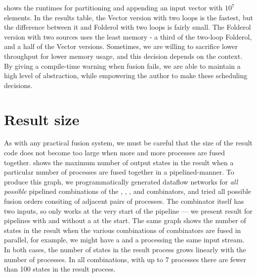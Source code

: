  shows the runtimes for partitioning and appending an input vector with $10^7$ elements.
In the results table, the Vector version with two loops is the fastest, but the difference between it and Folderol with two loops is fairly small.
The Folderol version with two sources uses the least memory - a third of the two-loop Folderol, and a half of the Vector versions.
Sometimes, we are willing to sacrifice lower throughput for lower memory usage, and this decision depends on the context.
By giving a compile-time warning when fusion fails, we are able to maintain a high level of abstraction, while empowering the author to make these scheduling decisions.

\section{Result size}

As with any practical fusion system, we must be careful that the size of the result code does not become too large when more and more processes are fused together.
 shows the maximum number of output states in the result when a particular number of processes are fused together in a pipelined-manner.
To produce this graph, we programmatically generated dataflow networks for \emph{all possible} pipelined combinations of the \Hs@map@, \Hs@filter@, \Hs@scan@, \Hs@group@ and \Hs@join@ combinators, and tried all possible fusion orders consiting of adjacent pairs of processes.
The \Hs@join@ combinator itself has two inputs, so only works at the very start of the pipeline --- we present result for pipelines with and without a \Hs@join@ at the start.
The same graph shows the number of states in the result when the various combinations of combinators are fused in parallel, for example, we might have a \Hs@map@ and a \Hs@filter@ processing the same input stream.
In both cases, the number of states in the result process grows linearly with the number of processes. In all combinations, with up to 7 processes there are fewer than 100 states in the result process. 



